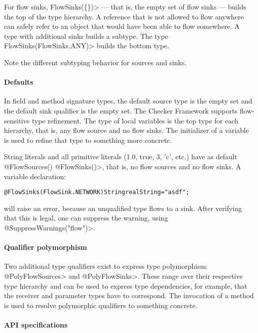 For flow sinks, \<FlowSinks(\{\})> --- that is, the empty set of flow
sinks --- builds the top of the type hierarchy.
A reference that is not allowed to flow anywhere can safely refer to
an object that would have been able to flow somewhere.
A type with additional sinks builds a subtype.
The type \<FlowSinks(FlowSinks.ANY)> builds the bottom type.

Note the different subtyping behavior for sources and sinks.


\paragraph{Defaults}

In field and method signature types, the default source type is the
empty set and the default sink qualifier is the empty set.
The Checker Framework supports flow-sensitive type refinement.
The type of local variables is the top type for each hierarchy, that
is, any flow source and no flow sinks.
The initializer of a variable is used to refine that type to something
more concrete.

String literals and all primitive literals (1.0, true, 3, 'c',
etc.) have as default \<@FlowSources({}) @FlowSinks({})>, that is, no
flow sources and no flow sinks.
A variable declaration:

\begin{alltt}
@FlowSinks(FlowSink.NETWORK) String realString = "asdf";
\end{alltt}

will raise an error, because an unqualified type flows to a sink.
After verifying that this is legal, one can suppress
the warning, using \<@SuppressWarnings("flow")>.


\paragraph{Qualifier polymorphism}

Two additional type qualifiers exist to express type polymorphism:
\<@PolyFlowSources> and \<@PolyFlowSinks>.
These range over their respective type hierarchy and can be used to
express type dependencies, for example, that the receiver and
parameter types have to correspond.
The invocation of a method is used to resolve polymorphic qualifiers
to something concrete.


\paragraph{API specifications}

